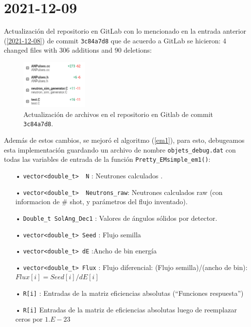 \documentclass[11pt,letterpaper]{article}
\begin{document}
\section{2021-12-09}
\label{2021-12-09}
Actualización del repositorio en GitLab con lo mencionado en la entrada anterior (\ref{2021-12-08}) de commit \verb|3c84a7d8| que de acuerdo a GitLab se hicieron: 4 changed files with 306 additions and 90 deletions:

\begin{figure}[H]
    \includegraphics[width=0.3\textwidth]{img/commit_3c84a7d8.png}
    \centering
     \cprotect\caption{Actualización de archivos en el repositorio en Gitlab de commit \verb|3c84a7d8|. }
\end{figure}

Además de estos cambios, se mejoró el algoritmo (\ref{em1}),  para esto, debugeamos esta implementación guardando un archivo de nombre \verb|objets_debug.dat| con todas las variables de entrada de la función \verb|Pretty_EMsimple_em1()|: 

\begin{itemize}

\item[•] \verb|vector<double_t>  N| : Neutrones calculados .
\item[•]\verb|vector<double_t>  Neutrons_raw|: Neutrones calculados raw (con informacion de \# shot, y parámetros del flujo inventado).
\item[•] \verb|Double_t SolAng_Dec1| : Valores de ángulos sólidos por detector.
\item[•]\verb|vector<double_t> Seed| : Flujo semilla
\item[•] \verb|vector<double_t> dE| :Ancho de bin energía
\item[•]\verb|vector<double_t> Flux|  : Flujo diferencial: (Flujo semilla)/(ancho de bin): $Flux[i] = Seed[i]/dE[i]$
\item[•] \verb|R[i]|  : Entradas de la matriz eficiencias absolutas (``Funciones respuesta'')
\item[•]\verb|R[i]| Entradas de la matriz de eficiencias absolutas luego de reemplazar ceros por $1.E-23$
\end{itemize}
\end{document}
